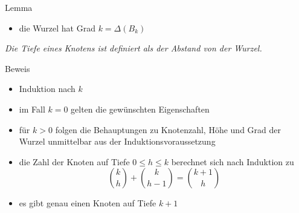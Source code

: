 \documentclass[aspectratio=1610, 11pt]{beamer}
\begin{document}
\begin{frame}
\begin{overprint}
\begin{block}{Lemma}
\begin{itemize}
				\item die Wurzel hat Grad $k=\Delta(B_k)$
			\end{itemize}
			\itshape Die Tiefe eines Knotens ist definiert als der Abstand von der Wurzel.
		\end{block}
		\begin{exampleblock}{Beweis}
			\begin{itemize}
				\item Induktion nach $k$
				\item im Fall $k=0$ gelten die gew\"unschten Eigenschaften
				\item f\"ur $k>0$ folgen die Behauptungen zu Knotenzahl, H\"ohe und Grad der Wurzel unmittelbar aus der Induktionsvoraussetzung
				\item die Zahl der Knoten auf Tiefe $0\leq h\leq k$ berechnet sich nach Induktion zu
					$$\binom kh+\binom k{h-1}=\binom{k+1}h$$
				\item es gibt genau einen Knoten auf Tiefe $k+1$
			\end{itemize}
		\end{exampleblock}
	\end{overprint}
\end{frame}
\end{document}
